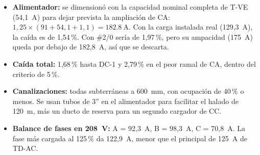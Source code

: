 \begin{itemize}
\item \textbf{Alimentador:} se dimensionó con la capacidad nominal completa de T-VE (54,1~A) para dejar prevista la ampliación de CA: $1{,}25\times(91+54{,}1+1{,}1)=\SI{182.8}{\ampere}$. Con la carga instalada real (129,3~A), la caída es de 1,54\,\%. Con \#2/0 sería de 1,97\,\%, pero su ampacidad (175~A) queda por debajo de 182,8~A, así que se descarta.
\item \textbf{Caída total:} 1,68\,\% hasta DC-1 y 2,79\,\% en el peor ramal de CA, dentro del criterio de 5\,\%.
\item \textbf{Canalizaciones:} todas subterráneas a 600~mm, con ocupación de 40\,\% o menos. Se usan tubos de 3'' en el alimentador para facilitar el halado de 120~m, más un ducto de reserva para un segundo cargador de CC.
\item \textbf{Balance de fases en 208~V:} A = 92,3~A, B = 98,3~A, C = 70,8~A. La fase más cargada al 125\,\% da 122,9~A, menor que el principal de 125~A de TD-AC.
\end{itemize}

